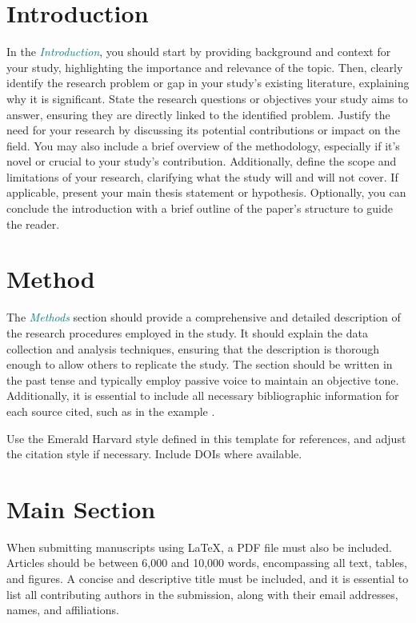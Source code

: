 \documentclass{article}
\begin{document}
\section{Introduction}
\label{sec:introduction}


In the \textcolor{teal}{\textit{Introduction}}, you should start by providing background and context for your study, highlighting the importance and relevance of the topic. 
Then, clearly identify the research problem or gap in your study's existing literature, explaining why it is significant. 
State the research questions or objectives your study aims to answer, ensuring they are directly linked to the identified problem. 
Justify the need for your research by discussing its potential contributions or impact on the field.
You may also include a brief overview of the methodology, especially if it's novel or crucial to your study's contribution. 
Additionally, define the scope and limitations of your research, clarifying what the study will and will not cover.
If applicable, present your main thesis statement or hypothesis. 
Optionally, you can conclude the introduction with a brief outline of the paper's structure to guide the reader.


\section{Method}
\label{sec:method}
The \textcolor{teal}{\textit{Methods}} section should provide a comprehensive and detailed description of the research procedures employed in the study. 
It should explain the data collection and analysis techniques, ensuring that the description is thorough enough to allow others to replicate the study. 
The section should be written in the past tense and typically employ passive voice to maintain an objective tone. 
Additionally, it is essential to include all necessary bibliographic information for each source cited, such as in the example \cite{fellows_research_2021}.

Use the Emerald Harvard style defined in this template for references, and adjust the citation style if necessary. Include DOIs where available. 

\section{Main Section}
\label{sec:main_section}
When submitting manuscripts using \LaTeX, a PDF file must also be included. 
Articles should be between 6,000 and 10,000 words, encompassing all text, tables, and figures. 
A concise and descriptive title must be included, and it is essential to list all contributing authors in the submission, along with their email addresses, names, and affiliations.
\end{document}
